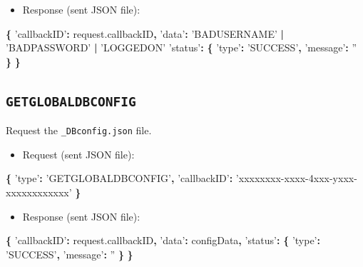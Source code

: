 \documentclass[]{book}
\newenvironment{Shaded}{\begin{snugshade}}{\end{snugshade}}
\newcommand{\AttributeTok}[1]{\textcolor[rgb]{0.77,0.63,0.00}{#1}}
\newcommand{\NormalTok}[1]{#1}
\newcommand{\OperatorTok}[1]{\textcolor[rgb]{0.81,0.36,0.00}{\textbf{#1}}}
\newcommand{\StringTok}[1]{\textcolor[rgb]{0.31,0.60,0.02}{#1}}
\newcommand{\VariableTok}[1]{\textcolor[rgb]{0.00,0.00,0.00}{#1}}
\providecommand{\tightlist}{%
  \setlength{\itemsep}{0pt}\setlength{\parskip}{0pt}}
\begin{document}
\begin{itemize}
\tightlist
\item
  Response (sent JSON file):
\end{itemize}

\begin{Shaded}
\begin{Highlighting}[]
\OperatorTok{\{}
  \StringTok{'callbackID'}\OperatorTok{:} \VariableTok{request}\NormalTok{.}\AttributeTok{callbackID}\OperatorTok{,}
  \StringTok{'data'}\OperatorTok{:} \StringTok{'BADUSERNAME'} \OperatorTok{|} \StringTok{'BADPASSWORD'} \OperatorTok{|} \StringTok{'LOGGEDON'}
  \StringTok{'status'}\OperatorTok{:} \OperatorTok{\{}
    \StringTok{'type'}\OperatorTok{:} \StringTok{'SUCCESS'}\OperatorTok{,}
    \StringTok{'message'}\OperatorTok{:} \StringTok{''}
  \OperatorTok{\}}
\OperatorTok{\}}
\end{Highlighting}
\end{Shaded}

\hypertarget{getglobaldbconfig}{%
\subsection{\texorpdfstring{\texttt{GETGLOBALDBCONFIG}}{GETGLOBALDBCONFIG}}\label{getglobaldbconfig}}

Request the \texttt{\_DBconfig.json} file.

\begin{itemize}
\tightlist
\item
  Request (sent JSON file):
\end{itemize}

\begin{Shaded}
\begin{Highlighting}[]
\OperatorTok{\{}
  \StringTok{'type'}\OperatorTok{:} \StringTok{'GETGLOBALDBCONFIG'}\OperatorTok{,}
  \StringTok{'callbackID'}\OperatorTok{:} \StringTok{'xxxxxxxx-xxxx-4xxx-yxxx-xxxxxxxxxxxx'}
\OperatorTok{\}}
\end{Highlighting}
\end{Shaded}

\begin{itemize}
\tightlist
\item
  Response (sent JSON file):
\end{itemize}

\begin{Shaded}
\begin{Highlighting}[]
\OperatorTok{\{}
  \StringTok{'callbackID'}\OperatorTok{:} \VariableTok{request}\NormalTok{.}\AttributeTok{callbackID}\OperatorTok{,}
  \StringTok{'data'}\OperatorTok{:}\NormalTok{ configData}\OperatorTok{,}
  \StringTok{'status'}\OperatorTok{:} \OperatorTok{\{}
    \StringTok{'type'}\OperatorTok{:} \StringTok{'SUCCESS'}\OperatorTok{,}
    \StringTok{'message'}\OperatorTok{:} \StringTok{''}
  \OperatorTok{\}}
\OperatorTok{\}}
\end{Highlighting}
\end{Shaded}
\end{document}
